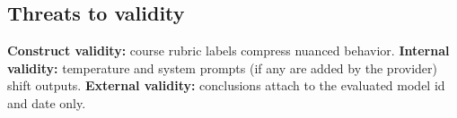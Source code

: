 \subsection{Threats to validity}
\textbf{Construct validity:} course rubric labels compress nuanced behavior. \textbf{Internal validity:} temperature and system prompts (if any are added by the provider) shift outputs. \textbf{External validity:} conclusions attach to the evaluated model id and date only.
